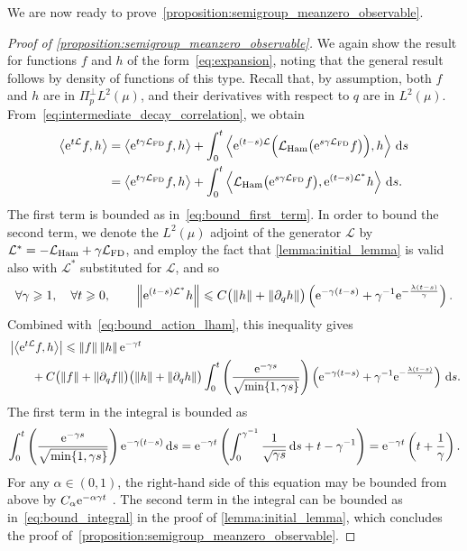 \documentclass[11pt,a4paper]{article}
\begin{document}
We are now ready to prove~\cref{proposition:semigroup_meanzero_observable}.
\begin{proof}
    [Proof of \cref{proposition:semigroup_meanzero_observable}]
    We again show the result for functions $f$ and $h$ of the form~\eqref{eq:expansion},
    noting that the general result follows by density of functions of this type.
    Recall that, by assumption, both $f$ and $h$ are in $\Pi_{p}^\perp L^2(\mu)$,
    and their derivatives with respect to $q$ are in $L^2(\mu)$.
    From~\eqref{eq:intermediate_decay_correlation}, we obtain
    \begin{align}
        \notag
        \ip{\e^{t \mathcal L} f}{h}
        &= \ip{\e^{t \gamma \mathcal L_{\rm FD}} f}{h}
        + \int_{0}^t \ip{\e^{(t-s) \mathcal L} \Bigl( \mathcal L_{\rm Ham} \bigl(\e^{s \gamma \mathcal L_{\rm FD}} f\bigr) \Bigr)}{h} \, \d s \\
        &= \ip{\e^{t \gamma \mathcal L_{\rm FD}} f}{h}
        + \int_{0}^t \ip{ \mathcal L_{\rm Ham} \bigl(\e^{s \gamma \mathcal L_{\rm FD}} f\bigr) }{\e^{(t-s) \mathcal L^*}  h} \, \d s.
    \end{align}
    The first term is bounded as in~\eqref{eq:bound_first_term}.
    In order to bound the second term,
    we denote the $L^2(\mu)$ adjoint of the generator $\mathcal L$ by~
    \(
        \mathcal L^* = - \mathcal L_{\rm Ham} + \gamma \mathcal L_{\rm FD}
    \),
    and employ the fact that \cref{lemma:initial_lemma} is valid also with $\mathcal L^*$ substituted for $\mathcal L$,
    and so
    \[
        \forall \gamma \geq 1, \quad
        \forall t \geq 0, \qquad
        \norm{\e^{(t-s)\mathcal L^*} h}
        \leq C \bigl( \norm{h} + \norm{\partial_q h} \bigr)
        \left( \e^{- \gamma (t-s)} + \gamma^{-1} \e^{-\frac{\lambda (t-s)}{\gamma}} \right).
    \]
    Combined with~\eqref{eq:bound_action_lham},
    this inequality gives
    \begin{align*}
        & \abs{ \ip{\e^{t \mathcal L} f}{h}}
        \leq \norm{f} \norm{h} \e^{-\gamma t} \\
        & \qquad + C \bigl( \norm{f} + \norm{\partial_q f} \bigr) \bigl( \norm{h} + \norm{\partial_q h} \bigr)
            \int_{0}^{t}  \left( \frac{\e^{-\gamma s}}{\sqrt{\min\{1, \gamma s\}}} \right)
         \left(  \e^{- \gamma (t-s)} + \gamma^{-1} \e^{-\frac{\lambda (t-s)}{\gamma}} \right) \, \d s.
    \end{align*}
    The first term in the integral is bounded as
    \[
        \int_{0}^{t}  \left( \frac{\mathrm{e}^{-\gamma s}}{\sqrt{\min\{1, \gamma s\}}} \right)
          \mathrm{e}^{- \gamma (t-s)}  \, \mathrm d s
        = \mathrm{e}^{- \gamma t} \left( \int_{0}^{\gamma^{-1}} \frac{1}{\sqrt{\gamma s}} \, \mathrm d s + t - \gamma^{-1} \right)
        = \mathrm{e}^{-\gamma t} \left( t + \frac{1}{\gamma} \right).
    \]
    For any $\alpha \in (0, 1)$, the right-hand side of this equation may be bounded from above by $C_{\alpha} \mathrm{e}^{- \alpha \gamma t}$ .
    The second term in the integral can be bounded as in~\eqref{eq:bound_integral} in the proof of \cref{lemma:initial_lemma},
    which concludes the proof of~\cref{proposition:semigroup_meanzero_observable}.
\end{proof}
\end{document}
